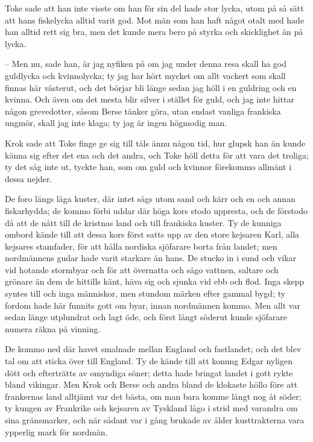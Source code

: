\initial Toke sade att han inte visste om han för sin del hade stor lycka, utom på så sätt att hans fiskelycka alltid varit god. Mot män som han haft något otalt med hade han alltid rett sig bra, men det kunde mera bero på styrka och skicklighet än på lycka.

– Men nu, sade han, är jag nyfiken på om jag under denna resa skall ha god guldlycka och kvinnolycka; ty jag har hört mycket om allt vackert som skall finnas här västerut, och det börjar bli länge sedan jag höll i en guldring och en kvinna. Och även om det mesta blir silver i stället för guld, och jag inte hittar någon grevedotter, såsom Berse tänker göra, utan endast vanliga frankiska ungmör, skall jag inte klaga; ty jag är ingen högmodig man.

\initial Krok sade att Toke finge ge sig till tåls ännu någon tid, hur glupsk han än kunde känna sig efter det ena och det andra, och Toke höll detta för att vara det troliga; ty det såg inte ut, tyckte han, som om guld och kvinnor förekommo allmänt i dessa nejder.

\initial De foro längs låga kuster, där intet sågs utom sand och kärr och en och annan fiskarhydda; de kommo förbi uddar där höga kors stodo uppresta, och de förstodo då att de nått till de kristnas land och till frankiska kuster. Ty de kunniga ombord kände till att dessa kors först satts upp av den store kejsaren Karl, alla kejsares stamfader, för att hålla nordiska sjöfarare borta från landet; men nordmännens gudar hade varit starkare än hans. De stucko in i sund och vikar vid hotande stormbyar och för att övernatta och sågo vattnen, saltare och grönare än dem de hittills känt, häva sig och sjunka vid ebb och flod. Inga skepp syntes till och inga människor, men stundom märken efter gammal bygd; ty fordom hade här funnits gott om byar, innan nordmännen kommo. Men allt var sedan länge utplundrat och lagt öde, och först långt söderut kunde sjöfarare numera räkna på vinning.

\initial De kommo ned där havet smalnade mellan England och fastlandet; och det blev tal om att sticka över till England. Ty de kände till att konung Edgar nyligen dött och efterträtts av omyndiga söner; detta hade bringat landet i gott rykte bland vikingar. Men Krok och Berse och andra bland de klokaste höllo före att frankernas land alltjämt var det bästa, om man bara komme långt nog åt söder; ty kungen av Frankrike och kejsaren av Tyskland lågo i strid med varandra om sina gränsmarker, och när sådant var i gång brukade av ålder kusttrakterna vara ypperlig mark för nordmän.

